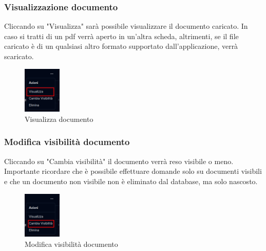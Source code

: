\subsubsection{Visualizzazione documento}
Cliccando su "Visualizza" sarà possibile visualizzare il documento caricato. In caso si tratti di un pdf verrà aperto in un'altra scheda, altrimenti, se il file caricato è di un qualsiasi altro formato supportato dall'applicazione, verrà scaricato.  
\begin{figure}[h!]
    \centering
    \includegraphics[width=0.16\textwidth]{menuactiondocvisualizza.png}
    \caption{Visualizza documento}\label{fig:seedocs}
\end{figure}
\subsubsection{Modifica visibilità documento}
Cliccando su "Cambia visibilità" il documento verrà reso visibile o meno. Importante ricordare che è possibile effettuare domande solo su documenti visibili e che un documento non visibile non è eliminato dal database, ma solo nascosto.
\begin{figure}[h!]
    \centering
    \includegraphics[width=0.16\textwidth]{menuactiondocvisibility.png}
    \caption{Modifica visibilità documento}\label{fig:visibilitydocs}
\end{figure}
